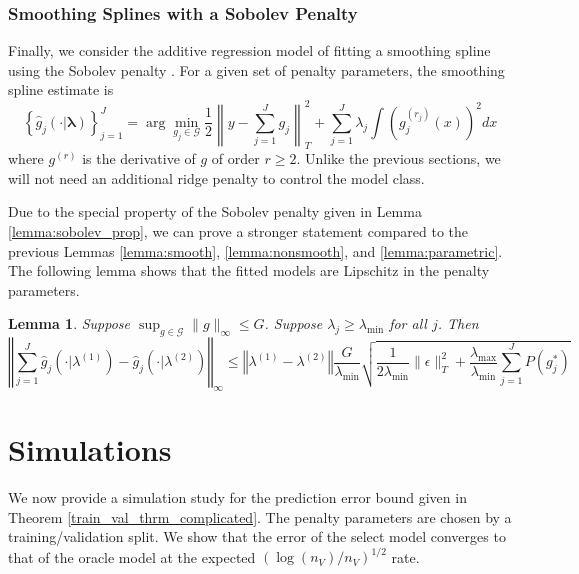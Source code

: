 \documentclass[12pt]{article}
\newtheorem{lemma}{Lemma}
\begin{document}
\subsubsection{Smoothing Splines with a Sobolev Penalty}

Finally, we consider the additive regression model of fitting a smoothing spline using the Sobolev penalty \citep{de1978practical, wahba1990spline, green1994nonparametric}. For a given set of penalty parameters, the smoothing spline estimate is
\begin{equation}
\left \{ \hat{g}_j(\cdot | \boldsymbol \lambda) \right \}_{j=1}^J =
\arg\min_{g_j\in\mathcal{G}}
\frac{1}{2} \left \|y- \sum_{j=1}^J g_j \right \|_{T}^{2}
+ \sum_{j=1}^J \lambda_j \int (g_j^{(r_j)}(x))^2 dx
\end{equation}
where $g^{(r)}$ is the derivative of $g$ of order $r \ge 2$. Unlike the previous sections, we will not need an additional ridge penalty to control the model class.

Due to the special property of the Sobolev penalty given in Lemma \ref{lemma:sobolev_prop}, we can prove a stronger statement compared to the previous Lemmas \ref{lemma:smooth}, \ref{lemma:nonsmooth}, and \ref{lemma:parametric}. The following lemma shows that the fitted models are Lipschitz in the penalty parameters.

\begin{lemma}
\label{lemma:sobolev}
Suppose $\sup_{g \in \mathcal{G}} \|g\|_\infty \le G$.
Suppose $\lambda_j \ge \lambda_{\min}$ for all $j$.
Then
\begin{equation}
\left\Vert \sum_{j=1}^J \hat{g}_j(\cdot|\lambda^{(1)}) - \hat{g}_j(\cdot|\lambda^{(2)}) \right\Vert _{\infty}
\le
\left\Vert \lambda^{(1)}-\lambda^{(2)}\right\Vert
\frac{G}{\lambda_{\min}}
\sqrt{\frac{1}{2\lambda_{\min}}\|\epsilon\|_{T}^{2}
+\frac{\lambda_{\max}}{\lambda_{\min}}\sum_{j=1}^{J}P\left(g_j^{*}\right)}
\end{equation}
\end{lemma}

\section{Simulations}\label{sec:simulations}

We now provide a simulation study for the prediction error bound given in Theorem \ref{train_val_thrm_complicated}. The penalty parameters are chosen by a training/validation split. We show that the error of the select model converges to that of the oracle model at the expected $(\log(n_V)/n_V)^{1/2}$ rate.
\end{document}
